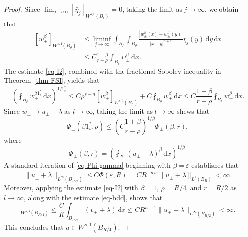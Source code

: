 \documentclass{amsart}
\theoremstyle{plain}
\theoremstyle{definition}
\numberwithin{equation}{section}
\begin{document}
\begin{proof}
Since $\lim_{j \to \infty} [\bar{\eta}_j]_{W^{s, 1}(B_r)} = 0$, taking the limit as $j \to \infty$, we obtain that
\begin{equation}\label{eq-I2}
\begin{split}
[w_\pm^\beta]_{W^{s, 1}(B_\rho)}
&\leq \liminf_{j \to \infty} \int_{B_\rho} \int_{B_\rho} \frac{|w_\pm^\beta(x)-w_\pm^\beta(y)|}{|x-y|^{n+s}} \bar{\eta}_j(y) \,\mathrm{d}y \,\mathrm{d}x \\
&\leq C \frac{1+\beta}{r-\rho} \int_{B_r} w_\pm^\beta \,\mathrm{d}x.
\end{split}
\end{equation}
The estimate \eqref{eq-I2}, combined with the fractional Sobolev inequality in Theorem~\ref{thm-FSI}, yields that
\begin{equation*}
\left( \fint_{B_\rho} w_\pm^{\beta 1^{\ast}_s} \,\mathrm{d}x \right)^{1/1^{\ast}_s} \leq C \rho^{s-n} [w_\pm^\beta]_{W^{s, 1}(B_\rho)} + C \fint_{B_\rho} w_\pm^\beta \,\mathrm{d}x \leq C \frac{1+\beta}{r-\rho} \fint_{B_r} w_\pm^\beta \,\mathrm{d}x.
\end{equation*}
Since $w_\pm \to u_\pm+\lambda$ as $l \to \infty$, taking the limit as $l \to \infty$ shows that
\begin{equation}\label{eq-Phi-gamma}
\Phi_\pm(\beta 1^{\ast}_s, \rho) \leq \left( C \frac{1+\beta}{r-\rho} \right)^{1/\beta} \Phi_\pm(\beta, r),
\end{equation}
where
\begin{equation*}
\Phi_\pm(\beta, r) = \left( \fint_{B_r} (u_\pm+\lambda)^{\beta} \,\mathrm{d}x \right)^{1/\beta}.
\end{equation*}
A standard iteration of \eqref{eq-Phi-gamma} beginning with $\beta=\varepsilon$ establishes that
\begin{equation}\label{eq-bdd}
\|u_\pm+\lambda\|_{L^\infty(B_{R/2})} \leq C \Phi(\varepsilon, R) = C R^{-n/\varepsilon} \|u_\pm+\lambda\|_{L^{\varepsilon}(B_{R})} < \infty.
\end{equation}
Moreover, applying the estimate \eqref{eq-I2} with $\beta=1$, $\rho=R/4$, and $r=R/2$ as $l \to \infty$, along with the estimate \eqref{eq-bdd}, shows that
\begin{equation*}
[u_\pm]_{W^{s, 1}(B_{R/4})} \leq \frac{C}{R} \int_{B_{R/2}} (u_\pm+\lambda) \,\mathrm{d}x \leq CR^{n-1} \|u_\pm+\lambda\|_{L^\infty(B_{R/2})} < \infty.
\end{equation*}
This concludes that $u \in W^{s, 1}(B_{R/4})$.
\end{proof}
\end{document}
